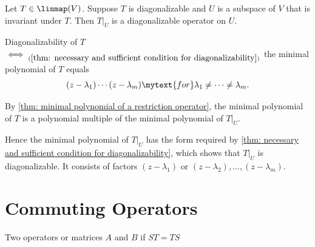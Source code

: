 \setcounter{thm}{64}
\begin{thm}
  \label{thm: restriction of diagonalizable operator to invariant subspace}
  Let $T\in \linmap(V)$. Suppose $T$ is diagonalizable and $U$ is a subspace of $V$ that is invariant under $T$.
  Then $\left.T\right|_U$ is a diagonalizable operator on $U$.
\end{thm}
\begin{prf}
  Diagonalizability of $T$ $\iff_{(\ref{thm: necessary and sufficient condition for diagonalizability})}$ the minimal polynomial of $T$ equals
  \begin{equation}
    (z-\lambda_1)\cdots(z-\lambda_m) \mytext{for} \lambda_1 \neq \cdots \neq \lambda_m.
  \end{equation}

  By \ref{thm: minimal polynomial of a restriction operator}, the minimal polynomial of $T$ is a polynomial multiple of the minimal polynomial of $\left.T\right|_U$.

  Hence the minimal polynomial of $\left.T\right|_U$  has the form required by \ref{thm: necessary and sufficient condition for diagonalizability}, which shows that $\left.T\right|_U$ is diagonalizable. It consists of factors $(z-\lambda_1)$ or $(z-\lambda_2), \dots, (z-\lambda_m)$.
\end{prf}


\section{Commuting Operators}
\begin{mydef}
  Two operators or matrices $A$ and $B$   if $ST=TS$
\end{mydef}